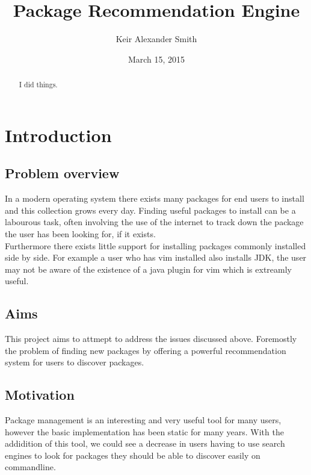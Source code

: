 \documentclass{l4proj}
\begin{document}
\title{Package Recommendation Engine}
\author{Keir Alexander Smith}
\date{March 15, 2015}
\maketitle
 
\begin{abstract}
I did things.
\end{abstract}
 
\tableofcontents
 
 
\chapter{Introduction}
 
\section{Problem overview}
In a modern operating system there exists many packages for end users to install and this collection grows every day. Finding useful packages to install can be a labourous task, often involving the use of the internet to track down the package the user has been looking for, if it exists.\\
Furthermore there exists little support for installing packages commonly installed side by side. For example a user who has vim installed also installs JDK, the user may not be aware of the existence of a java plugin for vim which is extreamly useful.
 
\section{Aims}
This project aims to attmept to address the issues discussed above. Foremostly the problem of finding new packages by offering a powerful recommendation system for users to discover packages. 
 
\section{Motivation}
Package management is an interesting and very useful tool for many users, however the basic implementation has been static for many years. With the addidition of this tool, we could see a decrease in users having to use search engines to look for packages they should be able to discover easily on commandline.
\end{document}
